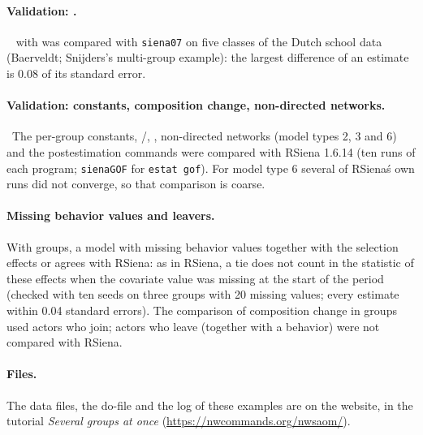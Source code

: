 \paragraph{Validation: \texorpdfstring{}{netbeh()}.}\  with  was compared with \texttt{siena07} on five classes of the Dutch school data (Baerveldt; Snijders's multi-group example): the largest difference of an estimate is 0.08 of its standard error.

\paragraph{Validation: constants, composition change, non-directed networks.}\ The per-group constants, /, , non-directed networks (model types 2, 3 and 6) and the postestimation commands were compared with RSiena 1.6.14 (ten runs of each program; \texttt{sienaGOF} for \texttt{estat gof}). For model type 6 several of RSiena\'s own runs did not converge, so that comparison is coarse.

\paragraph{Missing behavior values and leavers.} With groups, a model with missing behavior values together with the selection effects  or  agrees with RSiena: as in RSiena, a tie does not count in the statistic of these effects when the covariate value was missing at the start of the period (checked with ten seeds on three groups with 20 missing values; every estimate within 0.04 standard errors). The comparison of composition change in groups used actors who join; actors who leave (together with a behavior) were not compared with RSiena.

\paragraph{Files.} The data files, the do-file and the log of these examples are on the website, in the tutorial \emph{Several groups at once} (\url{https://nwcommands.org/nwsaom/}).
